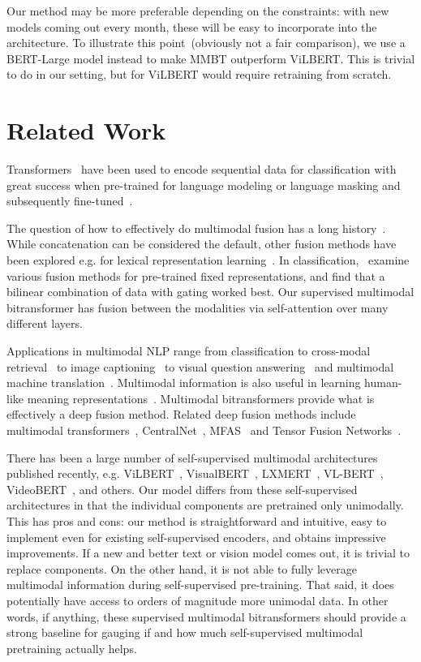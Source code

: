 \documentclass[11pt,a4paper]{article}
\begin{document}
Our method may be more preferable depending on the constraints: with new models coming out every month, these will be easy to incorporate into the architecture. To illustrate this point~(obviously not a fair comparison), we use a BERT-Large model instead to make MMBT outperform ViLBERT. This is trivial to do in our setting, but for ViLBERT would require retraining from scratch.

\section{Related Work}

Transformers~\cite{Vaswani:2017nips} have been used to encode sequential data for classification with great success when pre-trained for language modeling or language masking and subsequently fine-tuned~\cite{Radford:2018tr,Devlin:2019naacl}.

The question of how to effectively do multimodal fusion has a long history~\cite{Baltrusaitis:2019survey}. While concatenation can be considered the default, other fusion methods have been explored e.g. for lexical representation learning~\cite{Bruni:2014jair,Lazaridou:2015skipgram}. In classification,~ examine various fusion methods for pre-trained fixed representations, and find that a bilinear combination of data with gating worked best. Our supervised multimodal bitransformer has fusion between the modalities via self-attention over many different layers.

Applications in multimodal NLP range from classification to cross-modal retrieval~\cite{Weston:2011wsabie,Frome:2013devise,Socher:2013nips} to image captioning~\cite{Bernardi:2016captioning} to visual question answering~\cite{Antol2015vqa} and multimodal machine translation~\cite{Elliott:2017emnlp}. Multimodal information is also useful in learning human-like meaning representations~\cite{Baroni:16,Kiela:17thesis}. Multimodal bitransformers provide what is effectively a deep fusion method. Related deep fusion methods include multimodal transformers~\cite{Tsai:2019acl}, CentralNet~\cite{Vielzeuf:2018eccv}, MFAS~\cite{Perez-Rua:2019arxiv} and Tensor Fusion Networks~\cite{Zadeh2017tfn}.

There has been a large number of self-supervised multimodal architectures published recently, e.g. ViLBERT~\cite{Lu:2019vilbert}, VisualBERT~\cite{Li:2019visualbert}, LXMERT~\cite{Tan:2019lxmert}, VL-BERT~\cite{Su:2019vlbert}, VideoBERT~\cite{Sun:2019arxiv}, and others. Our model differs from these self-supervised architectures in that the individual components are pretrained only unimodally. This has pros and cons: our method is straightforward and intuitive, easy to implement even for existing self-supervised encoders, and obtains impressive improvements. If a new and better text or vision model comes out, it is trivial to replace components. On the other hand, it is not able to fully leverage multimodal information during self-supervised pre-training. That said, it does potentially have access to orders of magnitude more unimodal data. In other words, if anything, these supervised multimodal bitransformers should provide a strong baseline for gauging if and how much self-supervised multimodal pretraining actually helps.
\end{document}
